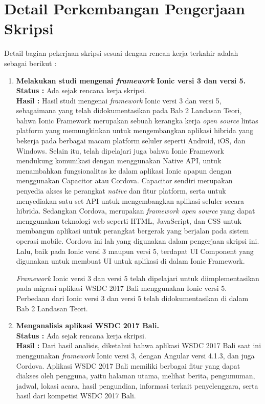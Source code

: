 \documentclass[a4paper,twoside]{article}
\begin{document}
\section{Detail Perkembangan Pengerjaan Skripsi}
Detail bagian pekerjaan skripsi sesuai dengan rencan kerja terkahir adalah sebagai berikut :	
	\begin{enumerate}
		\item \textbf{Melakukan studi mengenai \textit{framework} Ionic versi 3 dan versi 5.} \\
		{\bf Status :} Ada sejak rencana kerja skripsi.\\
		{\bf Hasil :} Hasil studi mengenai \textit{framework} Ionic versi 3 dan versi 5, sebagaimana yang telah didokumentasikan pada Bab 2 Landasan Teori, bahwa Ionic Framework merupakan sebuah kerangka kerja \textit{open source} lintas platform yang memungkinkan untuk mengembangkan aplikasi hibrida yang bekerja pada berbagai macam platform seluler seperti Android, iOS, dan Windows. Selain itu, telah dipelajari juga bahwa Ionic Framework mendukung komunikasi dengan menggunakan Native API, untuk menambahkan fungsionalitas ke dalam aplikasi Ionic apapun dengan menggunakan Capacitor atau Cordova. Capacitor sendiri merupakan penyedia akses ke perangkat \textit{native} dan fitur platform, serta untuk menyediakan satu set API untuk mengembangkan aplikasi seluler secara hibrida. Sedangkan Cordova, merupakan \textit{framework open source} yang dapat menggunakan teknologi web seperti HTML, JavaScript, dan CSS untuk membangun aplikasi untuk perangkat bergerak yang berjalan pada sistem operasi mobile. Cordova ini lah yang digunakan dalam pengerjaan skripsi ini. Lalu, baik pada Ionic versi 3 maupun versi 5, terdapat UI Component yang digunakan untuk membuat UI untuk aplikasi di dalam Ionic Framework.
		
		\textit{Framework} Ionic versi 3 dan versi 5 telah dipelajari untuk diimplementasikan pada migrasi aplikasi WSDC 2017 Bali menggunakan Ionic versi 5. Perbedaan dari Ionic versi 3 dan versi 5 telah didokumentasikan di dalam Bab 2 Landasan Teori.
		
		\item \textbf{Menganalisis aplikasi WSDC 2017 Bali.}\\
		{\bf Status :} Ada sejak rencana kerja skripsi.\\
		{\bf Hasil :} Dari hasil analisis, diketahui bahwa aplikasi WSDC 2017 Bali saat ini menggunakan \textit{framework} Ionic versi 3, dengan Angular versi 4.1.3, dan juga Cordova. Aplikasi WSDC 2017 Bali memiliki berbagai fitur yang dapat diakses oleh pengguna, yaitu halaman utama, melihat berita, pengumuman, jadwal, lokasi acara, hasil pengundian, informasi terkait penyelenggara, serta hasil dari kompetisi WSDC 2017 Bali. 
		

\end{enumerate}
\end{document}
